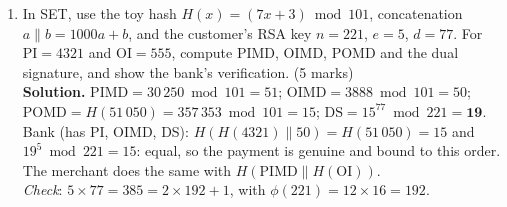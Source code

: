 \begin{enumerate}[leftmargin=1.6em,itemsep=4pt]
  \item In SET, use the toy hash $H(x) = (7x + 3) \bmod 101$, concatenation $a \| b = 1000a + b$, and the customer's RSA key $n = 221$, $e = 5$, $d = 77$. For $\mathrm{PI} = 4321$ and $\mathrm{OI} = 555$, compute PIMD, OIMD, POMD and the dual signature, and show the bank's verification. \hfill (5 marks)\\
  \textbf{Solution.} $\mathrm{PIMD} = 30\,250 \bmod 101 = 51$; $\mathrm{OIMD} = 3888 \bmod 101 = 50$; $\mathrm{POMD} = H(51\,050) = 357\,353 \bmod 101 = 15$; $\mathrm{DS} = 15^{77} \bmod 221 = \mathbf{19}$.\\
  Bank (has PI, OIMD, DS): $H(H(4321) \| 50) = H(51\,050) = 15$ and $19^5 \bmod 221 = 15$: equal, so the payment is genuine and bound to this order. The merchant does the same with $H(\mathrm{PIMD} \| H(\mathrm{OI}))$.\\
  \emph{Check}: $5 \times 77 = 385 = 2 \times 192 + 1$, with $\phi(221) = 12 \times 16 = 192$.


\end{enumerate}
